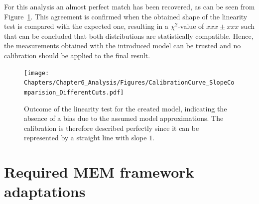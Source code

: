 For this analysis an almost perfect match has been recovered, as can be seen from Figure~\ref{fig::CalibCurve}. 
This agreement is confirmed when the obtained shape of the linearity test is compared with the expected one, resulting in a $\chi^{2}$-value of $xxx \pm xxx$ such that can be concluded that both distributions are statistically compatible. Hence, the measurements obtained with the introduced model can be trusted and no calibration should be applied to the final result.
\begin{figure}[h!t]
 \centering
 \texttt{[image: Chapters/Chapter6\_Analysis/Figures/CalibrationCurve\_SlopeComparision\_DifferentCuts.pdf]}
 \caption{Outcome of the linearity test for the created model, indicating the absence of a bias due to the assumed model approximations. The calibration is therefore described perfectly since it can be represented by a straight line with slope $1$.} \label{fig::CalibCurve}
\end{figure}
%
%
%

\section{Required MEM framework adaptations} \label{sec::RecoAdapt}

